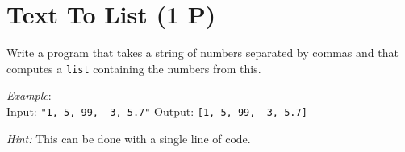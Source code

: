 \documentclass[
	english,
	fontsize=10pt,
	parskip=half,
	titlepage=true,
	DIV=12
]{scrartcl}
\newcommand*{\inPy}[1]{\texttt{#1}}
\begin{document}
\section{Text To List (1 P)}
Write a program that takes a string of numbers separated by commas and that computes a \inPy{list} containing the numbers from this.

\emph{Example}:\\
Input: \texttt{"1, 5, 99, -3, 5.7"} \tab
Output: \texttt{[1, 5, 99, -3, 5.7]}

\emph{Hint:} This can be done with a single line of code.
\end{document}
